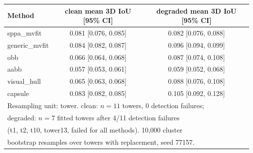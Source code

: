 \begin{tabular}{lcc}
\toprule
Method & clean mean 3D IoU [95\% CI] & degraded mean 3D IoU [95\% CI] \\
\midrule
sppa\_mvfit & 0.081 [0.076, 0.085] & 0.082 [0.076, 0.088] \\
generic\_mvfit & 0.084 [0.082, 0.087] & 0.096 [0.094, 0.099] \\
obb & 0.066 [0.064, 0.068] & 0.087 [0.074, 0.108] \\
aabb & 0.057 [0.053, 0.061] & 0.059 [0.052, 0.068] \\
visual\_hull & 0.065 [0.063, 0.068] & 0.088 [0.076, 0.108] \\
capsule & 0.083 [0.082, 0.085] & 0.105 [0.092, 0.128] \\
\bottomrule
\multicolumn{3}{l}{\footnotesize Resampling unit: tower. clean: $n{=}11$ towers, 0 detection failures;}
\\
\multicolumn{3}{l}{\footnotesize degraded: $n{=}7$ fitted towers after 4/11 detection failures}
\\
\multicolumn{3}{l}{\footnotesize (t1, t2, t10, tower13, failed for all methods). 10{,}000 cluster}
\\
\multicolumn{3}{l}{\footnotesize bootstrap resamples over towers with replacement, seed 77157.}
\\
\end{tabular}
